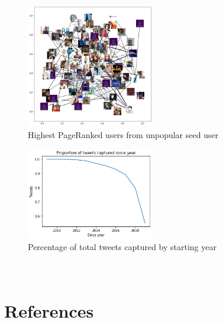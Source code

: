 \documentclass[12pt]{article}
\begin{document}
\begin{figure}[h!]
    \centering
     \includegraphics[width=0.5\textwidth]{nxgraph_unpopular_seed}
        \caption{Highest PageRanked users from unpopular seed user}
\end{figure}

\begin{figure}[h!]
    \centering
     \includegraphics[width=0.5\textwidth]{tweets_since_year}
        \caption{Percentage of total tweets captured by starting year}
\end{figure}

\section{\\References}
\end{document}
